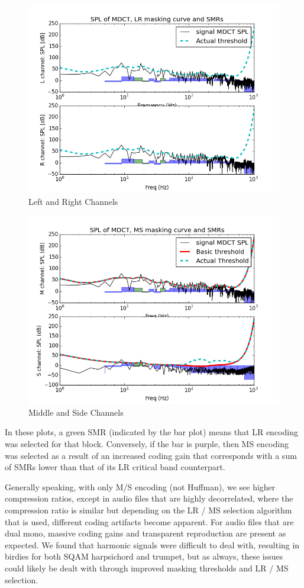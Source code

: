\documentclass{vldb}
\begin{document}
\begin{figure}[ht] 
\centering
\includegraphics[width=3.5 in]{LR_Threshold}
\caption{Left and Right Channels}
\label{fig:LRTHR}
\end{figure}

\begin{figure}[ht] 
\centering
\includegraphics[width=3.5 in]{MS_Threshold}
\caption{Middle and Side Channels}
\label{fig:MSTHR}
\end{figure}

In these plots, a green SMR (indicated by the bar plot) means that LR encoding was selected for that block. Conversely, if the bar is purple, then MS encoding was selected as a result of an increased coding gain that corresponds with a sum of SMRs lower than that of its LR critical band counterpart. 

Generally speaking, with only M/S encoding (not Huffman), we see higher compression ratios, except in audio files that are highly decorrelated, where the compression ratio is similar but depending on the LR / MS selection algorithm that is used, different coding artifacts become apparent. For audio files that are dual mono, massive coding gains and transparent reproduction are present as expected. We found that harmonic signals were difficult to deal with, resulting in birdies for both SQAM harpsichord and trumpet, but as always, these issues could likely be dealt with through improved masking thresholds and LR / MS selection.
\end{document}
